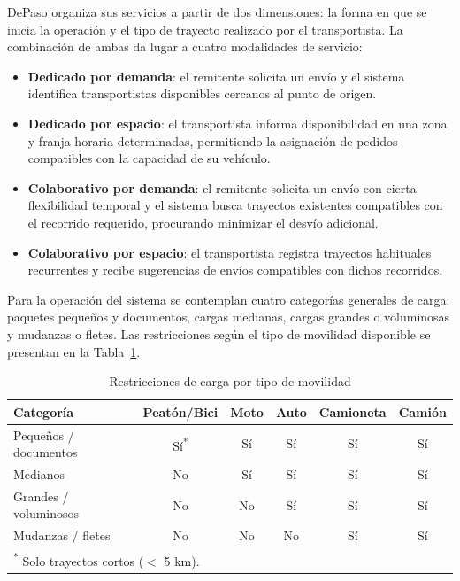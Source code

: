 DePaso organiza sus servicios a partir de dos dimensiones: la forma en que se inicia la operación y el tipo de trayecto realizado por el transportista. La combinación de ambas da lugar a cuatro modalidades de servicio:

\begin{itemize}[leftmargin=2em]
    \item \textbf{Dedicado por demanda}: el remitente solicita un envío y el sistema identifica transportistas disponibles cercanos al punto de origen.
    
    \item \textbf{Dedicado por espacio}: el transportista informa disponibilidad en una zona y franja horaria determinadas, permitiendo la asignación de pedidos compatibles con la capacidad de su vehículo.
    
    \item \textbf{Colaborativo por demanda}: el remitente solicita un envío con cierta flexibilidad temporal y el sistema busca trayectos existentes compatibles con el recorrido requerido, procurando minimizar el desvío adicional.
    
    \item \textbf{Colaborativo por espacio}: el transportista registra trayectos habituales recurrentes y recibe sugerencias de envíos compatibles con dichos recorridos.
\end{itemize}

Para la operación del sistema se contemplan cuatro categorías generales de carga: paquetes pequeños y documentos, cargas medianas, cargas grandes o voluminosas y mudanzas o fletes. Las restricciones según el tipo de movilidad disponible se presentan en la Tabla~\ref{tab:restricciones}.
\begin{table}[H]
    \caption{Restricciones de carga por tipo de movilidad}
    \label{tab:restricciones}
    \centering
    \small
    \begin{tabular}{lccccc}
        \toprule
        \textbf{Categoría} & \textbf{Peatón/Bici} & \textbf{Moto} & \textbf{Auto} & \textbf{Camioneta} & \textbf{Camión} \\
        \midrule
        Pequeños / documentos & Sí\textsuperscript{*} & Sí & Sí & Sí & Sí \\
        Medianos              & No & Sí & Sí & Sí & Sí \\
        Grandes / voluminosos & No & No & Sí & Sí & Sí \\
        Mudanzas / fletes     & No & No & No & Sí & Sí \\
        \bottomrule
        \multicolumn{6}{l}{\textsuperscript{*} Solo trayectos cortos ($<$ 5 km).}
    \end{tabular}
\end{table}

